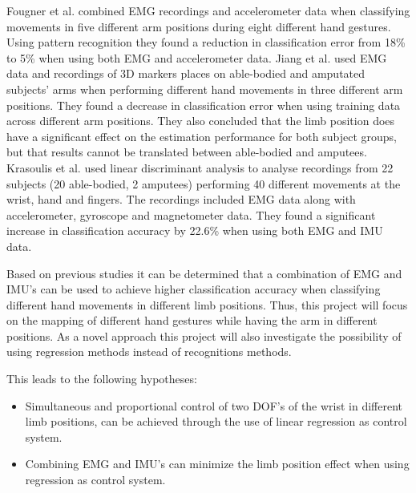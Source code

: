 Fougner et al. combined EMG recordings and accelerometer data when classifying movements in five different arm positions during eight different hand gestures. Using pattern recognition they found a reduction in classification error from 18\% to 5\% when using both EMG and accelerometer data. \cite{Fougner2011} Jiang et al. used EMG data and recordings of 3D markers places on able-bodied and amputated subjects' arms when performing different hand movements in three different arm positions. They found a decrease in classification error when using training data across different arm positions. They also concluded that the limb position does have a significant effect on the estimation performance for both subject groups, but that results cannot be translated between able-bodied and amputees. \cite{Jiang2013} Krasoulis et al. used linear discriminant analysis to analyse recordings from 22 subjects (20 able-bodied, 2 amputees) performing 40 different movements at the wrist, hand and fingers. The recordings included EMG data along with accelerometer, gyroscope and magnetometer data. They found a significant increase in classification accuracy by 22.6\% when using both EMG and IMU data. \cite{Krasoulis2017} 

Based on previous studies it can be determined that a combination of EMG and IMU's can be used to achieve higher classification accuracy when classifying different hand movements in different limb positions. Thus, this project will focus on the mapping of different hand gestures while having the arm in different positions. As a novel approach this project will also investigate the possibility of using regression methods instead of recognitions methods.  


This leads to the following hypotheses:
\begin{itemize}
	\item Simultaneous and proportional control of two DOF's of the wrist in different limb positions, can be achieved through the use of linear regression as control system. 
	\item Combining EMG and IMU's can minimize the limb position effect when using regression as control system. 
\end{itemize}







  	
  	
  	
  	